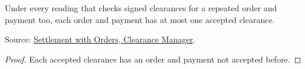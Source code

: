 \begin{theorem}
  \label{thm:accounting-one-clearance-checked}
  Under every reading that checks signed clearances for a repeated order
  and payment too, each order and payment has at most one accepted
  clearance.

  Source: \href{https://standards.atlassian.net/wiki/spaces/SWO/pages/574259794}{Settlement with Orders, Clearance Manager}.
\end{theorem}
\begin{proof}
  Each accepted clearance has an order and payment not accepted before.
\end{proof}

